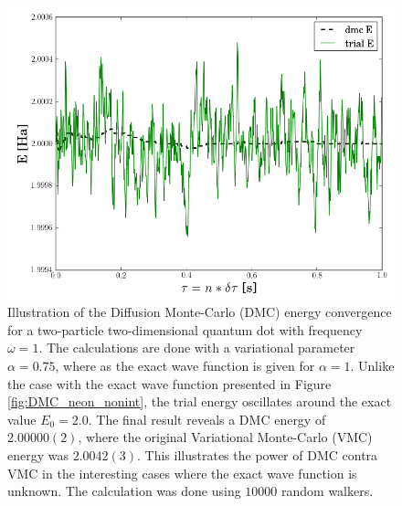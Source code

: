 \begin{figure}[h]
 \begin{center}
  \includegraphics[scale=0.5]{../Graphics/DMC_notExactWF.png}
  \caption{Illustration of the Diffusion Monte-Carlo (DMC) energy convergence for a two-particle two-dimensional quantum dot with frequency $\omega=1$. The calculations are done with a variational parameter $\alpha=0.75$, where as the exact wave function is given for $\alpha=1$. Unlike the case with the exact wave function presented in Figure \ref{fig:DMC_neon_nonint}, the trial energy oscillates around the exact value $E_0 = 2.0$. The final result reveals a DMC energy of $2.00000(2)$, where the original Variational Monte-Carlo (VMC) energy was $2.0042(3)$. This illustrates the power of DMC contra VMC in the interesting cases where the exact wave function is unknown. The calculation was done using $10000$ random walkers.}
  \label{fig:DMC_nonExactWF}
 \end{center}
\end{figure}